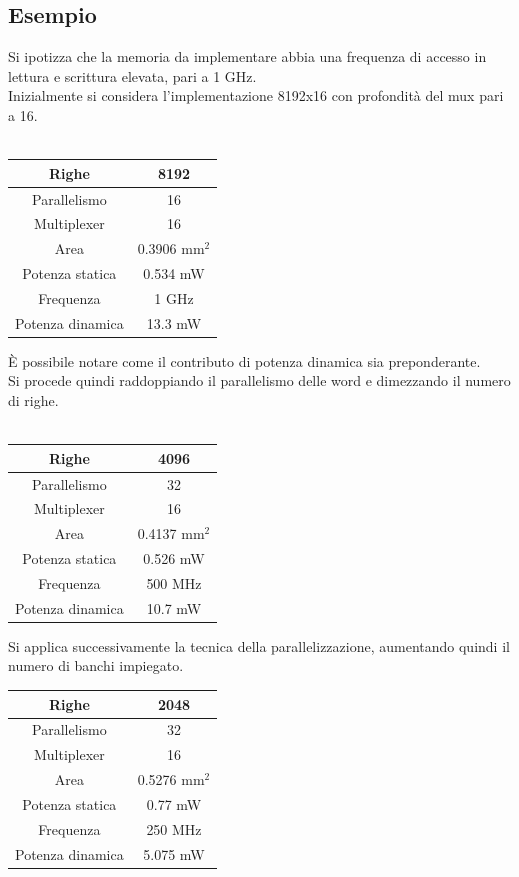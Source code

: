 \documentclass[11pt,  english, makeidx, a4paper, titlepage, oneside]{book}
\begin{document}
\subsection{Esempio}
Si ipotizza che la memoria da implementare abbia una frequenza di accesso in lettura e scrittura elevata, pari a 1 GHz.
\\
Inizialmente si considera l'implementazione 8192x16 con profondità del mux pari a 16.
\\\\
\begin{center}
	\begin{tabular}{|c|c|}
	\hline
	Righe & 8192\\
	\hline
	Parallelismo & 16\\
	\hline
	Multiplexer & 16\\
	\hline
	Area & 0.3906 mm$^2$\\
	\hline
	Potenza statica & 0.534 mW\\
	\hline
	Frequenza & 1 GHz\\
	\hline
	Potenza dinamica & 13.3 mW\\
	\hline
	\end{tabular}	
\end{center}
\vspace{0.3cm}
È possibile notare come il contributo di potenza dinamica sia preponderante.
\\
Si procede quindi raddoppiando il parallelismo delle word e dimezzando il numero di righe.
\\\\
\begin{center}
	\begin{tabular}{|c|c|}
	\hline
	Righe & 4096\\
	\hline
	Parallelismo & 32\\
	\hline
	Multiplexer & 16\\
	\hline
	Area & 0.4137 mm$^2$\\
	\hline
	Potenza statica & 0.526 mW\\
	\hline
	Frequenza & 500 MHz\\
	\hline
	Potenza dinamica & 10.7 mW\\
	\hline
	\end{tabular}	
\end{center}
\vspace{0.3cm}
Si applica successivamente la tecnica della parallelizzazione, aumentando quindi il numero di banchi impiegato.
\begin{center}
	\begin{tabular}{|c|c|}
	\hline
	Righe & 2048\\
	\hline
	Parallelismo & 32\\
	\hline
	Multiplexer & 16\\
	\hline
	Area & 0.5276 mm$^2$\\
	\hline
	Potenza statica & 0.77 mW\\
	\hline
	Frequenza & 250 MHz\\
	\hline
	Potenza dinamica & 5.075 mW\\
	\hline
	\end{tabular}	
\end{center}
\end{document}
